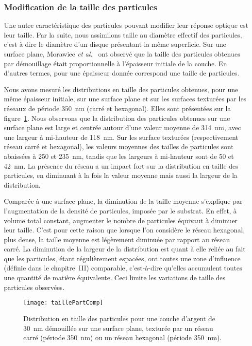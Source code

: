 \subsubsection{Modification de la taille des particules}
Une autre caractéristique des particules pouvant modifier leur réponse optique est leur taille. Par la suite, nous assimilons \og taille \fg{} au diamètre effectif des particules, c'est à dire le diamètre d'un disque présentant la même superficie. Sur une surface plane, Morawiec \textit{et al.}~\cite{morawiec2013self} ont observé que la taille des particules obtenues par démouillage était proportionnelle à l'épaisseur initiale de la couche. En d'autres termes, pour une épaisseur donnée correspond une taille de particules.\par 
Nous avons mesuré les distributions en taille des particules obtenues, pour une même épaisseur initiale, sur une surface plane et sur les surfaces texturées par les réseaux de période 350~nm (carré et hexagonal). Elles sont présentées sur la figure~\ref{taillePartComp}. Nous observons que la distribution des particules obtenues sur une surface plane est large et centrée autour d'une valeur moyenne de 314~nm, avec une largeur à mi-hauteur de 118~nm. Sur les surface texturées (respectivement réseau carré et hexagonal), les valeurs moyennes des tailles de particules sont abaissées à 250 et 235~nm, tandis que les largeurs à mi-hauteur sont de 50 et 42~nm. La présence du réseau a un impact fort sur la distribution en taille des particules, en diminuant à la fois la valeur moyenne mais aussi la largeur de la distribution.\par 
Comparée à une surface plane, la diminution de la taille moyenne s'explique par l'augmentation de la densité de particules, imposée par le substrat. En effet, à volume total constant, augmenter le nombre de particules équivaut à diminuer leur taille. C'est pour cette raison que lorsque l'on considère le réseau hexagonal, plus dense, la taille moyenne est légèrement diminuée par rapport au réseau carré. La diminution de la largeur de la distribution est quant à elle reliée au fait que les particules, étant régulièrement espacées, ont toutes une zone d'influence (définie dans le chapitre~III) comparable, c'est-à-dire qu'elles accumulent toutes une quantité de matière équivalente. Ceci limite les variations de taille des particules observées. \par 
\begin{figure}[!htb]
\centering
\texttt{[image: taillePartComp]}
\caption{Distribution en taille des particules pour une couche d'argent de 30~nm démouillée sur une surface plane, texturée par un réseau carré (période 350~nm) ou un réseau hexagonal (période 350~nm).}
\label{taillePartComp}
\end{figure}

